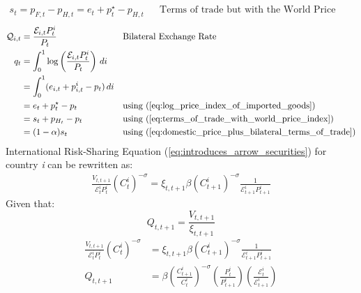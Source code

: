 \documentclass[12pt]{article}
\begin{document}
\begin{align}
    s_t = p_{F,t} - p_{H,t} = e_t + p_t^{\star} - p_{H,t} \label{eq:terms_of_trade_with_world_price_index} &  & \text{Terms of trade but with the World Price Index}
\end{align}
\begin{align}
    \mathcal{Q}_{i,t} & = \frac{\mathcal{E}_{i,t}P_{t}^i}{P_t}                                        &  & \text{Bilateral Exchange Rate}                                       \\
    q_t               & = \int_{0}^{1} \log \left( \frac{\mathcal{E}_{i,t}P_{t}^i}{P_t} \right) \, di                                                                           \\
                      & = \int_{0}^{1} (e_{i,t} + p_{i,t}^i - p_t) \, di                              &  &                                                                      \\
                      & = e_t + p_t^{\star} - p_t                                                     &  & \text{using (\ref{eq:log_price_index_of_imported_goods})}            \\
                      & = s_t + p_{H_t} - p_t                                                         &  & \text{using (\ref{eq:terms_of_trade_with_world_price_index})}        \\
                      & = (1-\alpha)s_t                                                               &  & \text{using (\ref{eq:domestic_price_plus_bilateral_terms_of_trade})}
\end{align}
International Risk-Sharing Equation (\ref{eq:introduces_arrow_securities}) for country \textit{i} can be rewritten as:
\begin{align}
    \frac{V_{t,t+1}}{\mathcal{E}^i_tP^i_t}({C^{i}_{t}})^{-\sigma} = \xi_{t,t+1} \beta ({C^{i}_{t+1}})^{-\sigma} \frac{1}{\mathcal{E}^i_{t+1}P^{i}_{t+1}}
\end{align}
Given that:
\begin{equation}
    Q_{t,t+1} = \frac{V_{t,t+1}}{\xi_{t,t+1}}
\end{equation}
\begin{align}
    \frac{V_{t,t+1}}{\mathcal{E}^i_tP^i_t}({C^{i}_{t}})^{-\sigma}         & = \xi_{t,t+1} \beta ({C^{i}_{t+1}})^{-\sigma} \frac{1}{\mathcal{E}^i_{t+1}P^{i}_{t+1}}                                                                    \\
    Q_{t,t+1}                                                             & = \beta \left(\frac{C^i_{t+1}}{C^i_{t}}\right)^{-\sigma} \left(\frac{P^i_t}{P^i_{t+1}}\right) \left(\frac{\mathcal{E}^i_{t}}{\mathcal{E}^i_{t+1}} \right) 
\end{align}
\end{document}
